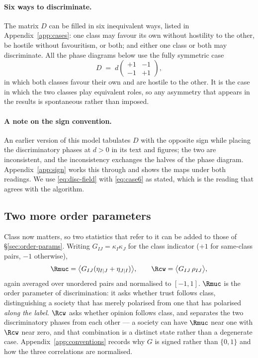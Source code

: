 \paragraph{Six ways to discriminate.} The matrix $D$ can be filled in six
inequivalent ways, listed in Appendix~\ref{app:cases}: one class may favour its
own without hostility to the other, be hostile without favouritism, or both; and
either one class or both may discriminate. All the phase diagrams below use the
fully symmetric case
%
\begin{equation}
  D \;=\; d\begin{pmatrix} +1 & -1\\ -1 & +1\end{pmatrix},
  \label{eq:case6}
\end{equation}
%
in which both classes favour their own and are hostile to the other. It is the
case in which the two classes play equivalent roles, so any asymmetry that
appears in the results is spontaneous rather than imposed.

\paragraph{A note on the sign convention.} An earlier version of this model
\citep{caticha2026discrimination} tabulates $D$ with the opposite sign while
placing the discriminatory phases at $d>0$ in its text and figures; the two are
inconsistent, and the inconsistency exchanges the halves of the phase diagram.
Appendix~\ref{app:sign} works this through and shows the maps under both
readings. We use \eqref{eq:disc-field} with \eqref{eq:case6} as stated, which is
the reading that agrees with the algorithm.

\subsection{Two more order parameters}
\label{sec:class-order-params}

Class now matters, so two statistics that refer to it can be added to those of
\S\ref{sec:order-params}. Writing $G_{IJ}=\kappa_I\kappa_J$ for the class
indicator ($+1$ for same-class pairs, $-1$ otherwise),
%
\begin{equation}
  \Rmuc = \bigl\langle G_{IJ}(\eta_{I|J}+\eta_{J|I}) \bigr\rangle,
  \qquad
  \Rcw  = \bigl\langle G_{IJ}\,\rho_{IJ} \bigr\rangle,
  \label{eq:correlations}
\end{equation}
%
again averaged over unordered pairs and normalised to $[-1,1]$. $\Rmuc$ is the order
parameter of discrimination: it asks whether trust follows class, distinguishing a
society that has merely polarised from one that has polarised \emph{along the
label}. $\Rcw$ asks whether opinion follows class, and separates the two
discriminatory phases from each other --- a society can have $\Rmuc$ near one with
$\Rcw$ near zero, and that combination is a distinct state rather than a degenerate
case. Appendix~\ref{app:conventions} records why $G$ is signed rather than
$\{0,1\}$ and how the three correlations are normalised.
